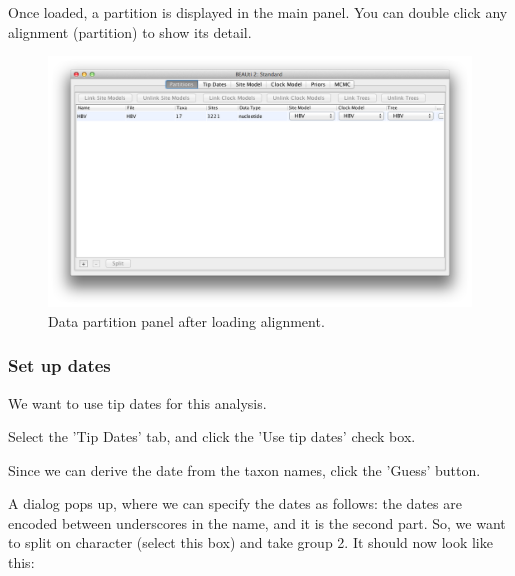 \documentclass{article}
\begin{document}
\medskip{}

Once loaded, a partition is displayed in the main panel.
You can double click any alignment (partition) to show its detail.

\begin{figure}
\begin{center}

\includegraphics[scale=0.4]{figures/BEAUti_DataPartitions}

\end{center}
\caption{\label{fig.datapartition} Data partition panel after loading alignment.}
\end{figure}

\subsubsection*{Set up dates}

We want to use tip dates for this analysis.

Select the 'Tip Dates' tab, and click the 'Use tip dates' check box.

Since we can derive the date from the taxon names, click the 'Guess' button.

A dialog pops up, where we can specify the dates as follows: the dates are encoded between underscores in the name, and it is the second part. So, we want to split on character (select this box) and take group 2. It should now look like this:
\end{document}
